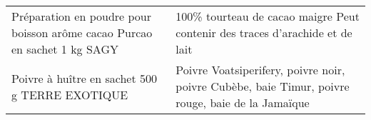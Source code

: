 \begin{longtable}{p{5cm}p{10cm}}
                                Préparation en poudre pour boisson arôme cacao Purcao en sachet 1 kg SAGY &                                                                                                                                                                                                                                                                                                                                                                                                                                                                                                                                                                                                                                                                                                                                                                                                                                                                                                                                                            100\% tourteau de cacao maigre  Peut contenir des traces d'arachide et de lait \\
                                                           Poivre à huître en sachet 500 g TERRE EXOTIQUE &                                                                                                                                                                                                                                                                                                                                                                                                                                                                                                                                                                                                                                                                                                                                                                                                                                                                                                                                        Poivre Voatsiperifery, poivre noir, poivre Cubèbe, baie Timur,  poivre rouge, baie de la Jamaïque \\

\end{longtable}
